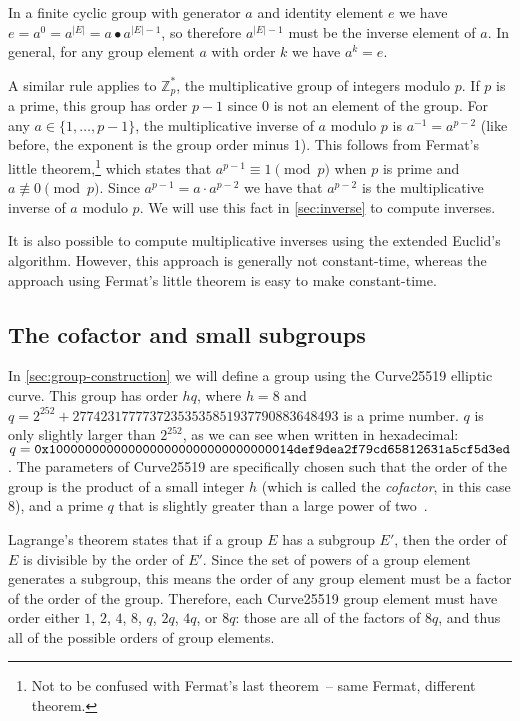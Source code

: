 \documentclass[manuscript]{acmart}
\begin{document}
In a finite cyclic group with generator $a$ and identity element $e$ we have $e = a^0 = a^{|E|} = a \bullet a^{|E|-1}$, so therefore $a^{|E|-1}$ must be the inverse element of $a$.
In general, for any group element $a$ with order $k$ we have $a^k = e$.

A similar rule applies to $\mathbb{Z}_p^*$, the multiplicative group of integers modulo $p$.
If $p$ is a prime, this group has order $p-1$ since 0 is not an element of the group.
For any $a \in \{1, \dots, p-1\}$, the multiplicative inverse of $a$ modulo $p$ is $a^{-1} = a^{p-2}$ (like before, the exponent is the group order minus 1).
This follows from Fermat's little theorem,\footnote{Not to be confused with Fermat's last theorem~-- same Fermat, different theorem.} which states that $a^{p-1} \equiv 1 \pmod{p}$ when $p$ is prime and $a \not\equiv 0 \pmod{p}$.
Since $a^{p-1} = a \cdot a^{p-2}$ we have that $a^{p-2}$ is the multiplicative inverse of $a$ modulo $p$.
We will use this fact in \autoref{sec:inverse} to compute inverses.

It is also possible to compute multiplicative inverses using the extended Euclid's algorithm.
However, this approach is generally not constant-time, whereas the approach using Fermat's little theorem is easy to make constant-time.

\subsection{The cofactor and small subgroups}\label{sec:cofactor}

In \autoref{sec:group-construction} we will define a group using the Curve25519 elliptic curve.
This group has order $hq$, where $h=8$ and $q = 2^{252} + 27742317777372353535851937790883648493$ is a prime number.
$q$ is only slightly larger than $2^{252}$, as we can see when written in hexadecimal: $q = \verb|0x1000000000000000000000000000000014def9dea2f79cd65812631a5cf5d3ed|$.
The parameters of Curve25519 are specifically chosen such that the order of the group is the product of a small integer $h$ (which is called the \emph{cofactor}, in this case 8), and a prime $q$ that is slightly greater than a large power of two~\cite{Bernstein:2006kw}.

Lagrange's theorem states that if a group $E$ has a subgroup $E'$, then the order of $E$ is divisible by the order of $E'$.
Since the set of powers of a group element generates a subgroup, this means the order of any group element must be a factor of the order of the group.
Therefore, each Curve25519 group element must have order either $1$, $2$, $4$, $8$, $q$, $2q$, $4q$, or $8q$: those are all of the factors of $8q$, and thus all of the possible orders of group elements.
\end{document}
